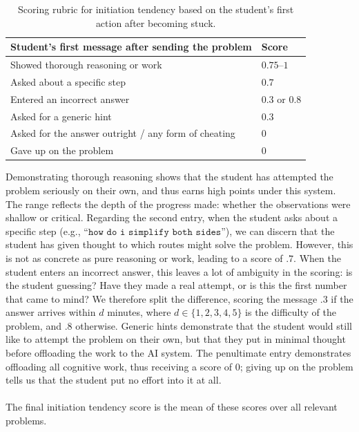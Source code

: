 \documentclass[12pt]{article}
\begin{document}
\begin{table}[H]
\centering
\renewcommand{\arraystretch}{1.3}
\begin{tabular}{p{} p{}}
\toprule
\textbf{Student's first message after sending the problem} & \textbf{Score} \\
\midrule
Showed thorough reasoning or work & $0.75$--$1$ \\
Asked about a specific step & $0.7$ \\
Entered an incorrect answer & $0.3$ or $0.8$ \\
Asked for a generic hint & $0.3$ \\
Asked for the answer outright / any form of cheating & $0$ \\
Gave up on the problem & $0$ \\
\bottomrule
\end{tabular}
\caption{Scoring rubric for initiation tendency based on the student's first action after becoming stuck.}
\label{tab:initiation-rubric}
\end{table}
\noindent Demonstrating thorough reasoning shows that the student has attempted the problem seriously on their own, and thus earns high points under this system. The range reflects the depth of the progress made: whether the observations were shallow or critical. Regarding the second entry, when the student asks about a specific step (e.g., ``$\texttt{how do i simplify both sides}$''), we can discern that the student has given thought to which routes might solve the problem. However, this is not as concrete as pure reasoning or work, leading to a score of $.7$. When the student enters an incorrect answer, this leaves a lot of ambiguity in the scoring: is the student guessing? Have they made a real attempt, or is this the first number that came to mind? We therefore split the difference, scoring the message $.3$ if the answer arrives within $d$ minutes, where $d \in \{1,2,3,4,5\}$ is the difficulty of the problem, and $.8$ otherwise. Generic hints demonstrate that the student would still like to attempt the problem on their own, but that they put in minimal thought before offloading the work to the AI system. The penultimate entry demonstrates offloading all cognitive work, thus receiving a score of $0$; giving up on the problem tells us that the student put no effort into it at all.
\\\\
The final initiation tendency score is the mean of these scores over all relevant problems.
\\\\
\end{document}
